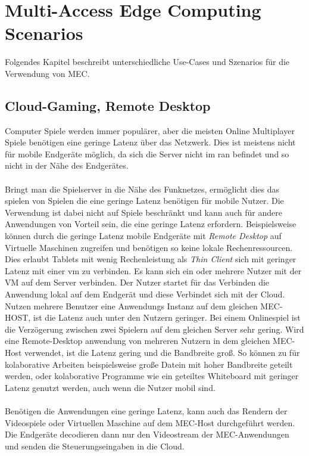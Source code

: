 \documentclass[runningheads]{llncs}
\numberwithin{figure}{section}
\begin{document}
\section{Multi-Access Edge Computing Scenarios}
\label{sec:Anwendungen}
Folgendes Kapitel beschreibt unterschiedliche Use-Cases und Szenarios für die Verwendung von MEC.\cite{patelContributorHuaweiVice}
\subsection{Cloud-Gaming, Remote Desktop}
\label{subsec:Cloud-Gaming}
Computer Spiele werden immer populärer, aber die meisten Online Multiplayer Spiele benötigen eine geringe 
Latenz über das Netzwerk. Dies ist meistens nicht für mobile Endgeräte möglich, da sich die Server nicht im \acrshort{ran} befindet und so
nicht in der Nähe des Endgerätes.
\\
\\
Bringt man die Spielserver in die Nähe des Funknetzes, ermöglicht dies das spielen von Spielen die eine geringe Latenz benötigen
für mobile Nutzer. 
Die Verwendung ist dabei nicht auf Spiele beschränkt und kann auch für andere Anwendungen von Vorteil sein, 
die eine geringe Latenz erfordern. Beispielsweise können durch die geringe Latenz mobile Endgeräte mit \textit{Remote Desktop} auf
Virtuelle Maschinen zugreifen und benötigen so keine lokale Rechenressourcen. Dies erlaubt Tablets mit wenig Rechenleistung als 
\textit{Thin Client} sich mit geringer Latenz mit einer \acrshort{vm} zu verbinden.
Es kann sich ein oder mehrere Nutzer mit der VM auf dem Server verbinden. 
Der Nutzer startet für das Verbinden
die Anwendung lokal auf dem Endgerät und diese Verbindet sich mit der Cloud. Nutzen mehrere Benutzer eine Anwendungs Instanz auf dem 
gleichen MEC-HOST, ist die Latenz auch unter den Nutzern geringer. Bei einem Onlinespiel ist die Verzögerung zwischen zwei Spielern
auf dem gleichen Server sehr gering. Wird eine Remote-Desktop anwendung von mehreren Nutzern in dem gleichen MEC-Host verwendet, 
ist die Latenz gering und die Bandbreite groß. 
So können zu für kolaborative Arbeiten beispielsweise große Datein mit hoher Bandbreite geteilt werden, oder kolaborative Programme wie
ein geteiltes Whiteboard mit geringer Latenz genutzt werden, auch wenn die Nutzer mobil sind. \cite{etsiMultiaccessEdgeComputing}
\\
\\
Benötigen die Anwendungen eine geringe Latenz, kann auch das Rendern der Videospiele oder Virtuellen Maschine auf dem MEC-Host 
durchgeführt werden. Die Endgeräte decodieren dann nur den Videostream der MEC-Anwendungen und senden die Steuerungseingaben in die Cloud.
\end{document}
